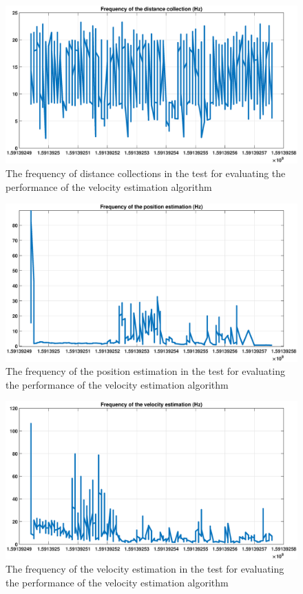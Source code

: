 \documentclass{article}
\begin{document}
\begin{figure}[thpb]
\centering
\includegraphics[scale=0.35]{Pics/R05June_Dist_Freq.eps}
\caption{The frequency of distance collections in the test for evaluating the performance of the velocity estimation algorithm}
\label{Fig_vel_05}
\end{figure}

\begin{figure}[thpb]
\centering
\includegraphics[scale=0.35]{Pics/R05June_Pos_Freq.eps}
\caption{The frequency of the position estimation in the test for evaluating the performance of the velocity estimation algorithm}
\label{Fig_vel_06}
\end{figure}

\begin{figure}[thpb]
\centering
\includegraphics[scale=0.35]{Pics/R05June_Vel_Freq.eps}
\caption{The frequency of the velocity estimation in the test for evaluating the performance of the velocity estimation algorithm}
\label{Fig_vel_07}
\end{figure}
\end{document}

